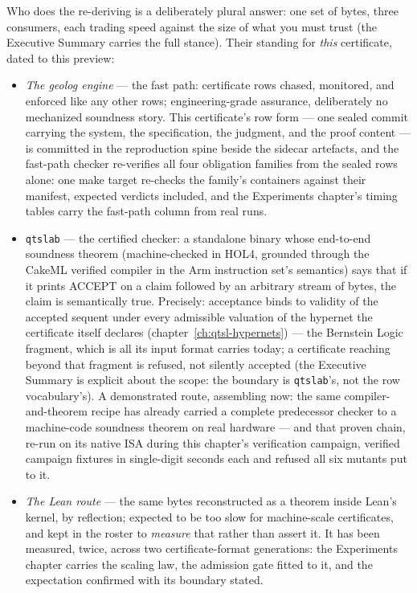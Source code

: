 Who does the re-deriving is a deliberately plural answer: one set of
bytes, three consumers, each trading speed against the size of what
you must trust (the Executive Summary carries the full stance).
Their standing for \emph{this} certificate, dated to this preview:

\begin{itemize}
\item \emph{The geolog engine} --- the fast path: certificate rows
  chased, monitored, and enforced like any other rows;
  engineering-grade assurance, deliberately no mechanized soundness
  story. This certificate's row form --- one sealed commit carrying
  the system, the specification, the judgment, and the proof content
  --- is committed in the reproduction spine beside the sidecar
  artefacts, and the fast-path checker re-verifies all four
  obligation families from the sealed rows alone: one make target
  re-checks the family's containers against their manifest, expected
  verdicts included, and the Experiments chapter's timing tables
  carry the fast-path column from real runs.
\item \texttt{qtslab} --- the certified checker: a standalone binary
  whose end-to-end soundness theorem (machine-checked in HOL4,
  grounded through the CakeML verified compiler in the Arm
  instruction set's semantics) says that if it prints ACCEPT on a
  claim followed by an arbitrary stream of bytes, the claim is
  semantically true. Precisely: acceptance binds to validity of the
  accepted sequent under every admissible valuation of the hypernet
  the certificate itself declares (chapter~\ref{ch:qtsl-hypernets})
  --- the Bernstein Logic fragment,
  which is all its input format carries today; a certificate
  reaching beyond that fragment is refused, not silently accepted
  (the Executive Summary is explicit about the scope: the boundary
  is \texttt{qtslab}'s, not the row vocabulary's). A demonstrated
  route, assembling now: the same
  compiler-and-theorem recipe has already carried a complete
  predecessor checker to a machine-code soundness theorem on real
  hardware --- and that proven chain, re-run on its native ISA
  during this chapter's verification campaign, verified campaign
  fixtures in single-digit seconds each and refused all six mutants
  put to it.
\item \emph{The Lean route} --- the same bytes reconstructed as a
  theorem inside Lean's kernel, by reflection; expected to be too
  slow for machine-scale certificates, and kept in the roster to
  \emph{measure} that rather than assert it. It has been measured,
  twice, across two certificate-format generations: the Experiments
  chapter carries the scaling law, the admission gate fitted to it,
  and the expectation confirmed with its boundary stated.
\end{itemize}

